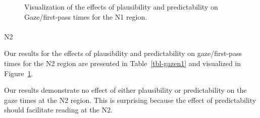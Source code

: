 \documentclass[
  12pt,
  letterpaper,
]{scrreprt}
\makeatletter
\let\oldparagraph\paragraph
\renewcommand{\paragraph}{
    \@ifstar
      \xxxParagraphStar
      \xxxParagraphNoStar
  }
\newcommand{\xxxParagraphStar}[1]{\oldparagraph*{#1}\mbox{}}
\newcommand{\xxxParagraphNoStar}[1]{\oldparagraph{#1}\mbox{}}
\makeatother
\begin{document}
\begin{figure}[htbp]

\caption{\label{fig-gazen1}Visualization of the effects of plausibility
and predictability on Gaze/first-pass times for the N1 region.}


\end{figure}%

\paragraph{N2}\label{n2-5}

Our results for the effects of plausibility and predictability on
gaze/first-pass times for the N2 region are presented in
Table~\ref{tbl-gazen1} and visualized in Figure~\ref{fig-gazen1}.

Our results demonstrate no effect of either plausibility or
predictability on the gaze times at the N2 region. This is surprising
because the effect of predictability should facilitate reading at the
N2.
\end{document}
